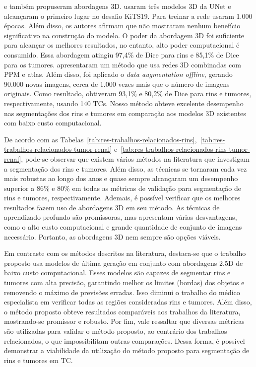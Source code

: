  e  também propuseram abordagens 3D.  usaram três modelos 3D da UNet e alcançaram o primeiro lugar no desafio KiTS19. Para treinar a rede usaram 1.000 épocas. Além disso, os autores afirmam que não mostraram nenhum benefício significativo na construção do modelo. O poder da abordagem 3D foi suficiente para alcançar os melhores resultados, no entanto, alto poder computacional é consumido. Essa abordagem atingiu 97,4\% de Dice para rins e 85,1\% de Dice para os tumores.  apresentaram um método que usa redes 3D combinadas com PPM e atlas. Além disso, foi aplicado o \textit{data augmentation offline}, gerando 90.000 novas imagens, cerca de 1.000 vezes mais que o número de imagens originais. Como resultado, obtiveram 93,1\% e 80,2\% de Dice para rins e tumores, respectivamente, usando 140 TCs. Nosso método obteve excelente desempenho nas segmentações dos rins e tumores em comparação aos modelos 3D existentes com baixo custo computacional.

De acordo com as Tabelas~\ref{tab:res-trabalhos-relacionados-rins},~\ref{tab:res-trabalhos-relacionados-tumor-renal} e~\ref{tab:res-trabalhos-relacionados-rins-tumor-renal}, pode-se observar que existem vários métodos na literatura que investigam a segmentação dos rins e tumores. Além disso, as técnicas se tornaram cada vez mais robustas ao longo dos anos e quase sempre alcançaram um desempenho superior a 86\% e 80\% em todas as métricas de validação para segmentação de rins e tumores, respectivamente. Ademais, é possível verificar que os melhores resultados fazem uso de abordagens 3D em seu método. As técnicas de aprendizado profundo são promissoras, mas apresentam várias desvantagens, como o alto custo computacional e grande quantidade de conjunto de imagens necessário. Portanto, as abordagens 3D nem sempre são opções viáveis.

Em contraste com os métodos descritos na literatura, destaca-se que o trabalho proposto usa modelos de última geração em conjunto com abordagens 2.5D de baixo custo computacional. Esses modelos são capazes de segmentar rins e tumores com alta precisão, garantindo melhor os limites (bordas) dos objetos e removendo o máximo de previsões erradas. Isso diminui o trabalho do médico especialista em verificar todas as regiões consideradas rins e tumores. Além disso, o método proposto obteve resultados comparáveis aos trabalhos da literatura, mostrando-se promissor e robusto. Por fim, vale ressaltar que diversas métricas são utilizadas para validar o método proposto, ao contrário dos trabalhos relacionados, o que impossibilitam outras comparações. Dessa forma, é possível demonstrar a viabilidade da utilização do método proposto para segmentação de rins e tumores em TC.

